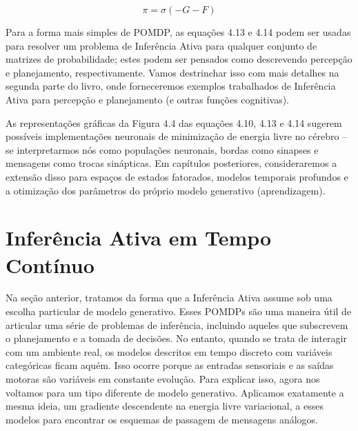 \documentclass[
  12pt,
]{book}
\begin{document}
\[ \pi = \sigma(-G-F)\]

Para a forma mais simples de POMDP, as equações 4.13 e 4.14 podem ser
usadas para resolver um problema de Inferência Ativa para qualquer
conjunto de matrizes de probabilidade; estes podem ser pensados como
descrevendo percepção e planejamento, respectivamente. Vamos destrinchar
isso com mais detalhes na segunda parte do livro, onde forneceremos
exemplos trabalhados de Inferência Ativa para percepção e planejamento
(e outras funções cognitivas).

As representações gráficas da Figura 4.4 das equações 4.10, 4.13 e 4.14
sugerem possíveis implementações neuronais de minimização de energia
livre no cérebro -- se interpretarmos nós como populações neuronais,
bordas como sinapses e mensagens como trocas sinápticas. Em capítulos
posteriores, consideraremos a extensão disso para espaços de estados
fatorados, modelos temporais profundos e a otimização dos parâmetros do
próprio modelo generativo (aprendizagem).

\hypertarget{inferuxeancia-ativa-em-tempo-contuxednuo}{%
\section{Inferência Ativa em Tempo Contínuo}\label{inferuxeancia-ativa-em-tempo-contuxednuo}}

Na seção anterior, tratamos da forma que a Inferência Ativa assume sob
uma escolha particular de modelo generativo. Esses POMDPs são uma
maneira útil de articular uma série de problemas de inferência,
incluindo aqueles que subscrevem o planejamento e a tomada de decisões.
No entanto, quando se trata de interagir com um ambiente real, os
modelos descritos em tempo discreto com variáveis categóricas ficam
aquém. Isso ocorre porque as entradas sensoriais e as saídas motoras são
variáveis em constante evolução. Para explicar isso, agora nos voltamos
para um tipo diferente de modelo generativo. Aplicamos exatamente a
mesma ideia, um gradiente descendente na energia livre variacional, a
esses modelos para encontrar os esquemas de passagem de mensagens
análogos.
\end{document}
